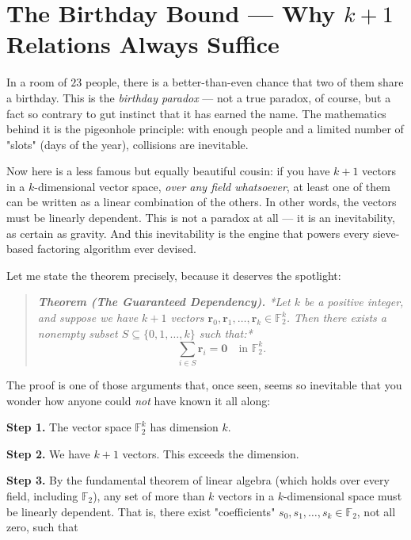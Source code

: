 \bigskip


\section{The Birthday Bound --- Why $k + 1$ Relations Always Suffice}

In a room of $23$ people, there is a better-than-even chance that two of them share a birthday. This is the \textit{birthday paradox} --- not a true paradox, of course, but a fact so contrary to gut instinct that it has earned the name. The mathematics behind it is the pigeonhole principle: with enough people and a limited number of "slots" (days of the year), collisions are inevitable.

Now here is a less famous but equally beautiful cousin: if you have $k + 1$ vectors in a $k$-dimensional vector space, \textit{over any field whatsoever}, at least one of them can be written as a linear combination of the others. In other words, the vectors must be linearly dependent. This is not a paradox at all --- it is an inevitability, as certain as gravity. And this inevitability is the engine that powers every sieve-based factoring algorithm ever devised.

Let me state the theorem precisely, because it deserves the spotlight:

\begin{quote}
\itshape \textbf{Theorem (The Guaranteed Dependency).} *Let $k$ be a positive integer, and suppose we have $k + 1$ vectors $\mathbf{r}_0, \mathbf{r}_1, \ldots, \mathbf{r}_k \in \mathbb{F}_2^k$. Then there exists a nonempty subset $S \subseteq \{0, 1, \ldots, k\}$ such that:* $$\sum_{i \in S} \mathbf{r}_i = \mathbf{0} \quad \text{in } \mathbb{F}_2^k.$$
\end{quote}

The proof is one of those arguments that, once seen, seems so inevitable that you wonder how anyone could \textit{not} have known it all along:

\textbf{Step 1.} The vector space $\mathbb{F}_2^k$ has dimension $k$.

\textbf{Step 2.} We have $k + 1$ vectors. This exceeds the dimension.

\textbf{Step 3.} By the fundamental theorem of linear algebra (which holds over every field, including $\mathbb{F}_2$), any set of more than $k$ vectors in a $k$-dimensional space must be linearly dependent. That is, there exist "coefficients" $s_0, s_1, \ldots, s_k \in \mathbb{F}_2$, not all zero, such that

